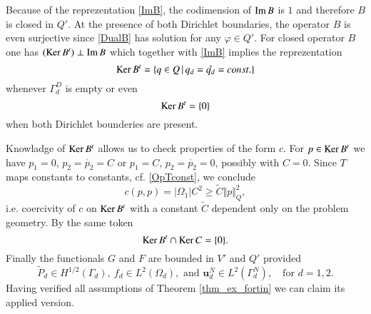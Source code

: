 \documentclass{elsarticle}
\def\vc#1{\mathbf{\boldsymbol{#1}}}     %
\def\abs#1{\lvert#1\rvert}
\def\norm#1{\bigl\Vert#1\bigr\Vert} %
\def\where{\,|\,}                    %
\def\vl{{\vc{u}}}
\def\phi{\varphi}
\def\mr{\mathring}
\def\Im{{\rm Im\,}}
\def\Ker{{\rm Ker\,}}
\begin{document}
Because of the reprezentation \eqref{ImB}, the codimension of $\Im B$ is $1$ and therefore $B$ is closed in $Q'$.
At the presence of both Dirichlet boundaries, the operator $B$ is even surjective since \eqref{DualB} has solution
for any $\phi\in Q'$. For closed operator $B$ one has $(\Ker B^t)\perp\Im B$ which together with \eqref{ImB} implies the reprezentation 
\begin{equation}
   \label{KerBTrep}
   \Ker B^t = \{ q\in Q\where q_d=\mr{q_d}=const.\}
\end{equation}
whenever $\Gamma_d^D$ is empty or even 
\[
\Ker B^t=\{0\} 
\]
when both Dirichlet bounderies are present. 

Knowladge of $\Ker B^t$ allows us to  check properties of the form $c$. For $p\in \Ker B^t$ we have $p_1=0$, $p_2=\mr{p_2}=C$ or $p_1=C$, $p_2=\mr{p_2}=0$, possibly with $C=0$. Since $T$ maps constants to constants, cf. \eqref{OpTconst}, we conclude
\[
c(p,p)=\abs{\Omega_1}C^2\ge \tilde C \norm{p}^2_{Q},
\]
i.e. coercivity of $c$ on $\Ker B^t$ with a constant $\tilde C$ dependent only on the problem geometry. By the same token 
\[
  \Ker B^t\cap\Ker C = \{0\}.
\]  
Finally the functionals $G$ and $F$ are bounded in $V'$ and $Q'$ provided 
\begin{equation}\label{data_cond}
        \tilde P_d\in H^{1/2}(\Gamma_d),\ f_d\in L^2(\Omega_d),\text{ and }\vl_d^N\in L^2(\Gamma_d^N),\quad \text{for }d=1,2.
\end{equation}
Having verified all assumptions of Theorem \ref{thm_ex_fortin} we can claim its applied version.
\end{document}
